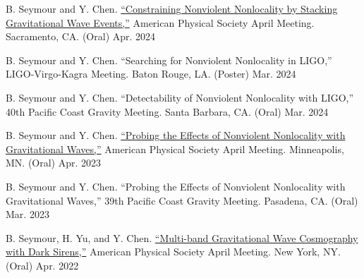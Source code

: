 

\begin{cvpresentationsmod}


    \cvpresentation
    {B. Seymour and Y. Chen. \href{https://meetings.aps.org/Meeting/APR23/Session/C08.9}{“Constraining Nonviolent Nonlocality by Stacking Gravitational Wave Events,”} American Physical Society April Meeting. Sacramento, CA. (Oral)}
    {Apr. 2024}
    

    \cvpresentation
    {B. Seymour and Y. Chen. “Searching for Nonviolent Nonlocality in LIGO,” LIGO-Virgo-Kagra Meeting. Baton Rouge, LA. (Poster)}
    {Mar. 2024}
    

    \cvpresentation
    {B. Seymour and Y. Chen. “Detectability of Nonviolent Nonlocality with LIGO,” 40th Pacific Coast Gravity Meeting. Santa Barbara, CA. (Oral)}
    {Mar. 2024}


    \cvpresentation
    {B. Seymour and Y. Chen. \href{https://meetings.aps.org/Meeting/APR23/Session/C08.9}{“Probing the Effects of Nonviolent Nonlocality with Gravitational Waves,”} American Physical Society April Meeting. Minneapolis, MN. (Oral)}
    {Apr. 2023}
    

    \cvpresentation
    {B. Seymour and Y. Chen. “Probing the Effects of Nonviolent Nonlocality with Gravitational Waves,” 39th Pacific Coast Gravity Meeting. Pasadena, CA. (Oral)}
    {Mar. 2023}


    \cvpresentation
    {B. Seymour, H. Yu, and Y. Chen. \href{https://meetings.aps.org/Meeting/APR22/Session/Q16.7}{“Multi-band Gravitational Wave Cosmography with Dark Sirens,”} American Physical Society April Meeting. New York, NY. (Oral)}
    {Apr. 2022}
    

\end{cvpresentationsmod}
